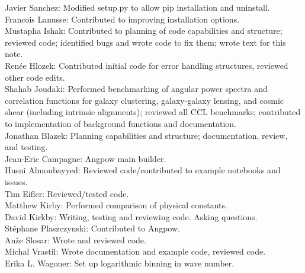 Javier Sanchez: Modified setup.py to allow pip installation and uninstall. \\
Francois Lanusse: Contributed to improving installation options. \\
Mustapha Ishak: Contributed to planning of code capabilities and structure; reviewed code; identified bugs and wrote code to fix them; wrote text for this note. \\
Ren\'ee Hlozek: Contributed initial code for error handling structures, reviewed other code edits. \\
Shahab Joudaki: Performed benchmarking of angular power spectra and correlation functions for galaxy clustering, galaxy-galaxy lensing, and cosmic shear (including intrinsic alignments); reviewed all CCL benchmarks; contributed to implementation of background functions and documentation.  \\
Jonathan Blazek: Planning capabilities and structure; documentation, review, and testing. \\
Jean-Eric Campagne: Angpow main builder. \\
Husni Almoubayyed: Reviewed code/contributed to example notebooks and issues. \\
Tim Eifler: Reviewed/tested code. \\
Matthew Kirby: Performed comparison of physical constants. \\
David Kirkby: Writing, testing and reviewing code. Asking questions. \\
St\'ephane Plaszczynski: Contributed to Angpow. \\
An\v{z}e Slosar: Wrote and reviewed code. \\
Michal Vrastil: Wrote documentation and example code, reviewed code. \\
Erika L. Wagoner: Set up logarithmic binning in wave number. \\
